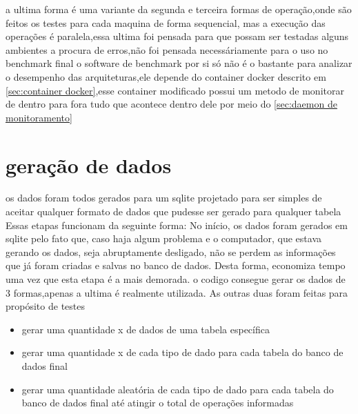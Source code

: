 \documentclass[
	12pt,				%
	openright,			%
	oneside,			%
	a4paper,			%
	english,			%
	french,				%
	spanish,			%
	brazil,				%
	]{abntex2}
\begin{document}
a ultima forma é uma variante da segunda e terceira formas de operação,onde são feitos os testes para cada maquina de forma sequencial, mas a execução das operações é paralela,essa ultima foi pensada para que possam ser testadas alguns ambientes a procura de erros,não foi pensada necessáriamente para o uso no benchmark final
o software de benchmark por si só não é o bastante para analizar o desempenho das arquiteturas,ele depende do container docker descrito em \autoref{sec:container docker},esse container modificado possui um metodo de monitorar de dentro para fora tudo que acontece dentro dele por meio do \autoref{sec:daemon de monitoramento} 


\section{geração de dados}
\label{sec:geração de dados}
os dados foram todos gerados para um sqlite projetado para ser simples de aceitar qualquer formato de dados que pudesse ser gerado para qualquer tabela
Essas etapas funcionam da seguinte forma:\newline
No início, os dados foram gerados em sqlite pelo fato que, caso haja algum problema e o computador, que estava gerando os dados, seja abruptamente desligado, não se perdem as informações que já foram criadas e salvas no banco de dados. Desta forma, economiza tempo uma vez que esta etapa é a mais demorada.\newline
o codigo consegue gerar os dados de 3 formas,apenas a ultima é realmente utilizada.
As outras duas foram feitas para propósito de testes

\begin{itemize}
\item gerar uma quantidade x de dados de uma tabela específica
\item gerar uma quantidade x de cada tipo de dado para cada tabela do banco de dados final
\item gerar uma quantidade aleatória de cada tipo de dado para cada tabela do banco de dados final até atingir o total de operações informadas
\end{itemize}
\end{document}

